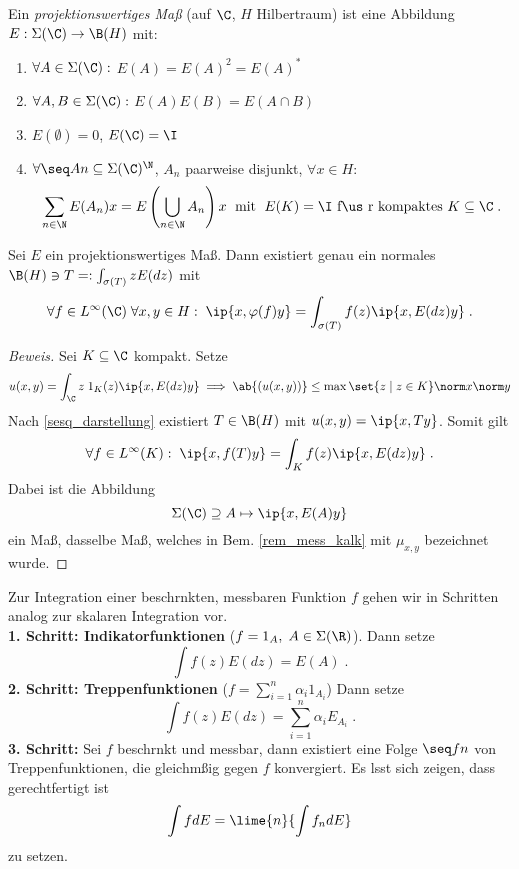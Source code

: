 	\begin{definition}
		Ein \textit{projektionswertiges Ma\ss{}} (auf $\C$, $H$ Hilbertraum) ist eine Abbildung \(E:\Sigma(\C)\to \B(H)\) mit:
		\begin{enumerate}
			\item \(\forall A \in \Sigma(\C):\) \(E(A) = E(A)^2 = E(A)^*\)
			\item \(\forall A, B \in \Sigma(\C):\) \(E(A)E(B) = E(A\cap B)\)
			\item \(E(\emptyset) = 0\), \(E(\C) = \I\)
			\item \(\forall \seq An \subseteq \Sigma(\C)^\N\), $A_n$ paarweise disjunkt, \(\forall x\in H:\)
			\[\sum_{n\in\N}E(A_n)x = E\left(\bigcup_{n\in\N}A_n\right)x\;\text{ mit }\; E(K) = \I \text{ f\us r kompaktes }K\subseteq \C\;.\]
		\end{enumerate}
	\end{definition}
	
	\begin{theorem}
		Sei $E$ ein projektionswertiges Ma\ss{}. Dann existiert genau ein normales \(\B(H)\ni T =: \int_{\sigma(T)} z E(dz)\) mit
		\[\forall f \in L^\infty(\C)\;\forall x, y\in H:\; \ip{x,\varphi(f)y} = \int_{\sigma(T)} f(z)\ip{x,E(dz)y}\;.\]
	\end{theorem}
		\begin{proof}[Beweis]
			Sei $K\subseteq \C$ kompakt. Setze
			\[u(x,y) = \int_{\C} z \;1_K(z) \ip{x, E(dz)y} \implies \ab{(u(x,y))} \leq \max\set{z\;\vert\;z\in K}\norm x\norm y\]
			Nach \ref{sesq_darstellung} existiert \(T\in \B(H)\) mit \(u(x,y) = \ip{x,Ty}\). Somit gilt 
			\[\forall f \in L^\infty(K):\; \ip{x, f(T)y} = \int_K f(z) \ip{x, E(dz) y}\;.\]
			Dabei ist die Abbildung 
			\[\Sigma(\C) \supseteq A \mapsto \ip{x, E(A)y}\]
			ein Ma\ss{}, dasselbe Ma\ss{}, welches in Bem. \ref{rem_mess_kalk} mit \(\mu_{x,y}\) bezeichnet wurde.
		\end{proof}
		\begin{rem}
			Zur Integration einer beschr\as nkten, messbaren Funktion $f$ gehen wir in Schritten analog zur skalaren Integration vor.\\
			\textbf{1. Schritt: Indikatorfunktionen} (\(f = 1_A,\; A\in\Sigma(\R)\)). Dann setze
			\[\int f(z) E(dz) = E(A)\;.\]
			\textbf{2. Schritt: Treppenfunktionen} (\(f = \sum_{i=1}^n \alpha_i 1_{A_i}\)) Dann setze
			\[\int f(z) E(dz) = \sum_{i=1}^n \alpha_i E_{A_i}\;.\]
			\textbf{3. Schritt:} Sei $f$ beschr\as nkt und messbar, dann existiert eine Folge \(\seq fn\) von Treppenfunktionen, die gleichm\as \ss{}ig gegen $f$ konvergiert. Es l\as sst sich zeigen, dass gerechtfertigt ist
			\[\int f dE = \lime{n}{\int f_n dE}\]
			zu setzen.
		\end{rem}
		
